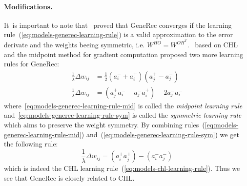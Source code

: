 \paragraph{Modifications.}
\label{sec:our-learning-rules}
\label{sec:models-generec-modifications} 
It~is important to note that~\citet{o1996bio} proved that GeneRec converges if the learning rule~(\ref{eq:models-generec-learning-rule}) is a valid approximation to the error derivate and the weights beeing symmetric, i.e. $W^{HO} = W^{OH^{T}}$.~\citet{o1996bio} based on CHL and the midpoint method for gradient computation proposed two more learning rules for GeneRec:
\begin{align}
  \label{eq:models-generec-learning-rule-mid}
  \frac{1}{\lambda} \Delta w_{ij} &=  \frac{1}{2}(a^{-}_i + a^{+}_i)(a^{+}_j - a^{-}_j) \\
  \label{eq:models-generec-learning-rule-sym}
  \frac{1}{\lambda} \Delta w_{ij} &=  (a^{+}_j a^{-}_i - a^{-}_j a^{+}_i) - 2a^{-}_j a^{-}_i
\end{align}
where~\ref{eq:models-generec-learning-rule-mid} is called the \emph{midpoint learning rule} and~\ref{eq:models-generec-learning-rule-sym} is called the \emph{symmetric learning rule} which aims to preserve the weight symmetry. By combining rules~(\ref{eq:models-generec-learning-rule-mid}) and~(\ref{eq:models-generec-learning-rule-sym}) we get the following rule: 
\begin{equation}
  \label{eq:models-generec-learning-rule-chl}
  \frac{1}{\lambda} \Delta w_{ij} = (a^{+}_i a^{+}_j) - (a^{-}_i a^{-}_j)
\end{equation}
which is indeed the CHL learning rule~(\ref{eq:models-chl-learning-rule}). Thus we see that GeneRec is closely related to CHL. 

